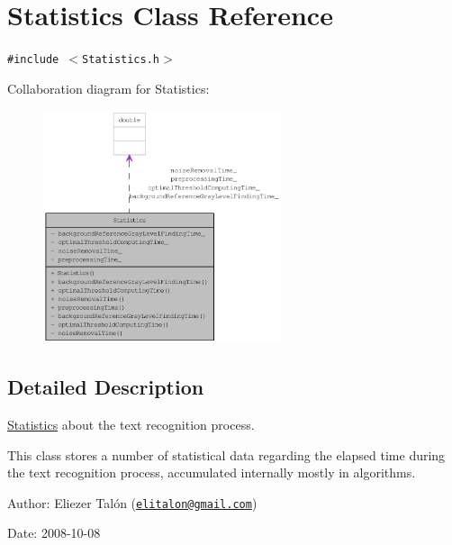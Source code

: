 \hypertarget{class_statistics}{
\section{Statistics Class Reference}
\label{class_statistics}
}
{\tt \#include $<$Statistics.h$>$}

Collaboration diagram for Statistics:\nopagebreak
\begin{figure}[H]
\begin{center}
\leavevmode
\includegraphics[width=198pt]{class_statistics__coll__graph}
\end{center}
\end{figure}


\subsection{Detailed Description}
\hyperlink{class_statistics}{Statistics} about the text recognition process. 

This class stores a number of statistical data regarding the elapsed time during the text recognition process, accumulated internally mostly in algorithms.

\begin{Desc}
\item[Author:]Eliezer Talón (\href{mailto:elitalon@gmail.com}{\tt elitalon@gmail.com}) \end{Desc}
\begin{Desc}
\item[Date:]2008-10-08 \end{Desc}


